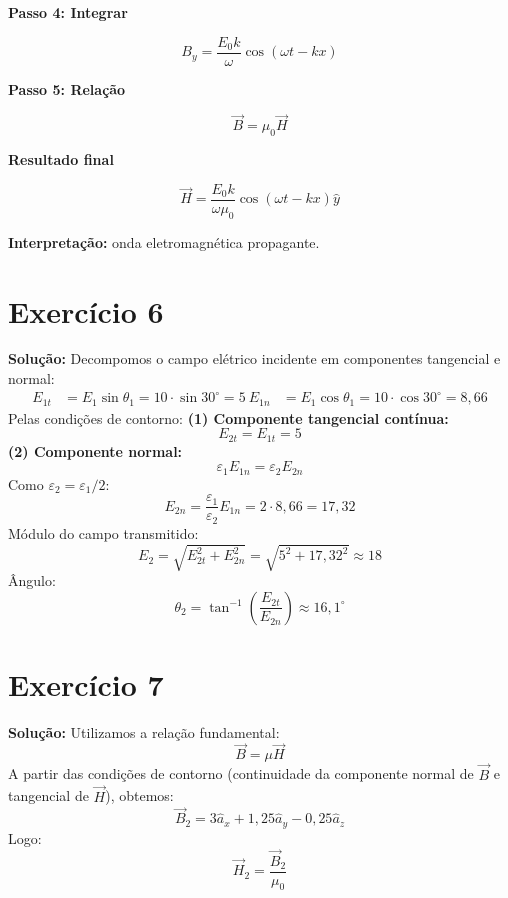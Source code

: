 \documentclass[12pt,a4paper]{article}
\begin{document}
\textbf{Passo 4: Integrar}

\begin{equation}
B_y = \frac{E_0 k}{\omega} \cos(\omega t - kx)
\end{equation}

\textbf{Passo 5: Relação}

\begin{equation}
\vec{B} = \mu_0 \vec{H}
\end{equation}

\textbf{Resultado final}

\begin{equation}
\boxed{
\vec{H} = \frac{E_0 k}{\omega \mu_0} \cos(\omega t - kx)\hat{y}
}
\end{equation}


\textbf{Interpretação:} onda eletromagnética propagante.



\section*{Exercício 6}
\textbf{Solução:}
Decompomos o campo elétrico incidente em componentes tangencial e normal:
\begin{align}
E_{1t} &= E_1 \sin \theta_1 = 10 \cdot \sin 30^\circ = 5 \
E_{1n} &= E_1 \cos \theta_1 = 10 \cdot \cos 30^\circ = 8{,}66
\end{align}
Pelas condições de contorno:
\textbf{(1) Componente tangencial contínua:}
\[
E_{2t} = E_{1t} = 5
\]
\textbf{(2) Componente normal:}
\[
\varepsilon_1 E_{1n} = \varepsilon_2 E_{2n}
\]
Como $\varepsilon_2 = \varepsilon_1/2$:
\[
E_{2n} = \frac{\varepsilon_1}{\varepsilon_2} E_{1n} = 2 \cdot 8{,}66 = 17{,}32
\]
Módulo do campo transmitido:
\[
E_2 = \sqrt{E_{2t}^2 + E_{2n}^2} = \sqrt{5^2 + 17{,}32^2} \approx 18
\]
Ângulo:
\[
\theta_2 = \tan^{-1}\left(\frac{E_{2t}}{E_{2n}}\right) \approx 16{,}1^\circ
\]

\newpage

\section*{Exercício 7}
\textbf{Solução:}
Utilizamos a relação fundamental:
\[
\vec{B} = \mu \vec{H}
\]
A partir das condições de contorno (continuidade da componente normal de $\vec{B}$ e tangencial de $\vec{H}$), obtemos:
\[
\vec{B}_2 = 3\hat{a}_x + 1{,}25\hat{a}_y - 0{,}25\hat{a}_z
\]
Logo:
\[
\vec{H}_2 = \frac{\vec{B}_2}{\mu_0}
\]
\end{document}

